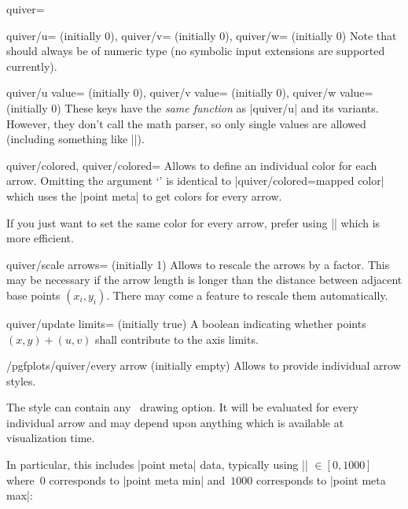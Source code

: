 {\begin{plottype}[/pgfplots]{quiver=\textcolor{black}{}}
\begin{pgfplotskeylist}{%
		quiver/u= (initially 0),
		quiver/v= (initially 0),
		quiver/w= (initially 0)}
		Note that  should always be of numeric type (no symbolic input extensions are supported currently).
	\end{pgfplotskeylist}
	\begin{pgfplotskeylist}{%
		quiver/u value= (initially 0),
		quiver/v value= (initially 0),
		quiver/w value= (initially 0)}
		These keys have the \emph{same function} as |quiver/u| and its variants. However, they don't call the math parser, so only single values are allowed (including something like ||).
	\end{pgfplotskeylist}

	\begin{pgfplotskeylist}{%
		quiver/colored,
		quiver/colored=}
		Allows to define an individual color for each arrow. Omitting the argument `' is identical to |quiver/colored=mapped color| which uses the |point meta| to get colors for every arrow.

		If you just want to set the same color for every arrow, prefer using || which is more efficient.		
	\end{pgfplotskeylist}

	\begin{pgfplotskey}{quiver/scale arrows= (initially 1)}
		Allows to rescale the arrows by a factor. This may be necessary if the arrow length is longer than the distance between adjacent base points $(x_i,y_i)$. There may come a feature to rescale them automatically.
	\end{pgfplotskey}

	\begin{pgfplotskey}{quiver/update limits= (initially true)}
		A boolean indicating whether points $(x,y)  + (u,v)$ shall contribute to the axis limits.		
	\end{pgfplotskey}

	\begin{stylekey}{/pgfplots/quiver/every arrow (initially empty)}
		Allows to provide individual arrow styles.

		The style can contain any \Tikz\ drawing option. It will be evaluated for every individual arrow and may depend upon anything which is available at visualization time. 
		
		In particular, this includes |point meta| data, typically using |\pgfplotspointmetatransformed| $\in [0,1000]$ where~$0$ corresponds to |point meta min| and~$1000$ corresponds to |point meta max|:\label{pgfplots:example:pointmeta:quiver}
\begin{codeexample}[]
\end{codeexample}
\end{stylekey}
\end{plottype}}
